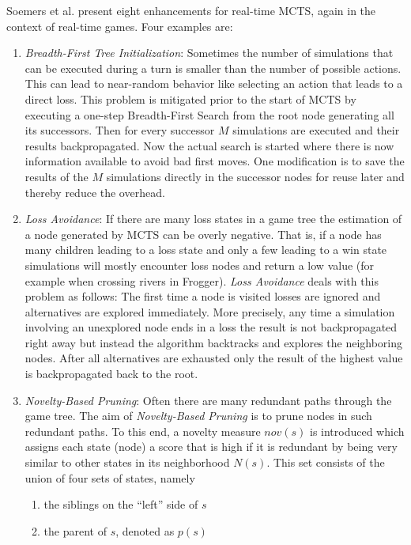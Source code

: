 Soemers et al. \cite{soemers2016enhancements} present eight enhancements for real-time MCTS, again in the context of real-time games. Four examples are:
\begin{enumerate}[label=\alph*)]
    \item \textit{Breadth-First Tree Initialization}: Sometimes the number of simulations that can be executed during a turn is smaller than the number of possible actions. This can lead to near-random behavior like selecting an action that leads to a direct loss. This problem is mitigated prior to the start of MCTS by executing a one-step Breadth-First Search from the root node generating all its successors. Then for every successor $M$ simulations are executed and their results backpropagated. Now the actual search is started where there is now information available to avoid bad first moves. One modification is to save the results of the $M$ simulations directly in the successor nodes for reuse later and thereby reduce the overhead.
    \item \textit{Loss Avoidance}: If there are many loss states in a game tree the estimation of a node generated by MCTS can be overly negative. That is, if a node has many children leading to a loss state and only a few leading to a win state simulations will mostly encounter loss nodes and return a low value (for example when crossing rivers in Frogger). \textit{Loss Avoidance} deals with this problem as follows: The first time a node is visited losses are ignored and alternatives are explored immediately. More precisely, any time a simulation involving an unexplored node ends in a loss the result is not backpropagated right away but instead the algorithm backtracks and explores the neighboring nodes. After all alternatives are exhausted only the result of the highest value is backpropagated back to the root.
    \item \textit{Novelty-Based Pruning}: Often there are many redundant paths through the game tree. The aim of \textit{Novelty-Based Pruning} is to prune nodes in such redundant paths. To this end, a novelty measure $nov(s)$ is introduced which assigns each state (node) a score that is high if it is redundant by being very similar to other states in its neighborhood $N(s)$. This set consists of the union of four sets of states, namely 
    \begin{enumerate}[label=\roman*)]
        \item the siblings on the \enquote{left} side of $s$
        \item the parent of $s$, denoted as $p(s)$

\end{enumerate}
\end{enumerate}
